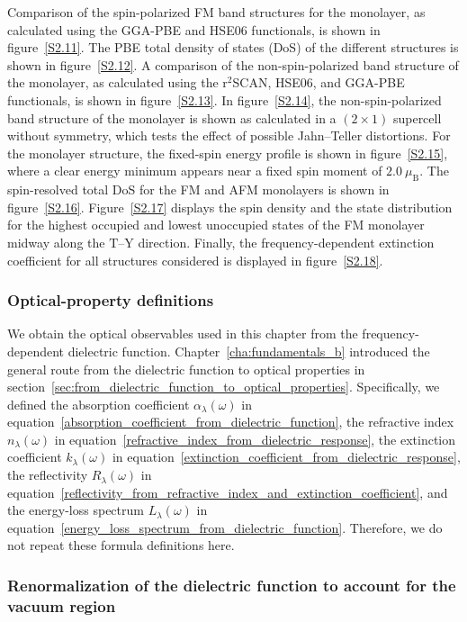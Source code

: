 Comparison of the spin-polarized FM band structures for the monolayer,
as calculated using the GGA-PBE and HSE06 functionals, is shown in figure~\ref{S2.11}.
The PBE total density of states (DoS) of the different structures is shown in figure~\ref{S2.12}.
A comparison of the non-spin-polarized band structure of the monolayer,
as calculated using the r$^{2}$SCAN, HSE06, and GGA-PBE functionals, is shown in figure~\ref{S2.13}.
In figure~\ref{S2.14}, the non-spin-polarized band structure of the monolayer is shown as calculated in a $(2\times1)$ supercell without symmetry,
which tests the effect of possible Jahn--Teller distortions.
For the monolayer structure, the fixed-spin energy profile is shown in figure~\ref{S2.15}, where a clear energy minimum appears near a fixed spin moment of $2.0~\mu_{\mathrm{B}}$.
The spin-resolved total DoS for the FM and AFM monolayers is shown in figure~\ref{S2.16}.
Figure~\ref{S2.17} displays the spin density and the state distribution for the highest occupied and lowest unoccupied states of the FM monolayer midway along the $\mathrm{T}$--$\mathrm{Y}$ direction.
Finally, the frequency-dependent extinction coefficient for all structures considered is displayed in figure~\ref{S2.18}.

\subsubsection*{Optical-property definitions}

We obtain the optical observables used in this chapter from the frequency-dependent dielectric function.
Chapter~\ref{cha:fundamentals_b} introduced the general route from the dielectric function to optical properties in section~\ref{sec:from_dielectric_function_to_optical_properties}.
Specifically,
we defined the absorption coefficient $\alpha_{\lambda}(\omega)$ in equation~\eqref{absorption_coefficient_from_dielectric_function},
the refractive index $n_{\lambda}(\omega)$ in equation~\eqref{refractive_index_from_dielectric_response},
the extinction coefficient $k_{\lambda}(\omega)$ in equation~\eqref{extinction_coefficient_from_dielectric_response},
the reflectivity $R_{\lambda}(\omega)$ in equation~\eqref{reflectivity_from_refractive_index_and_extinction_coefficient},
and the energy-loss spectrum $L_{\lambda}(\omega)$ in equation~\eqref{energy_loss_spectrum_from_dielectric_function}.
Therefore, we do not repeat these formula definitions here.

\subsubsection*{Renormalization of the dielectric function to account for the vacuum region}

